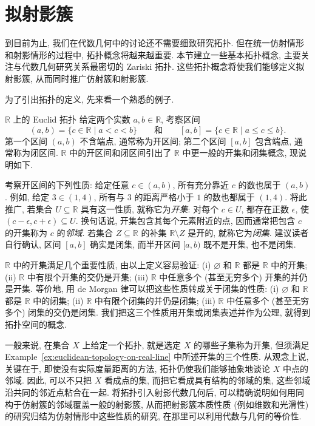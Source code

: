 \section{拟射影簇}\label{sec:quasiprojective-varieties}

到目前为止, 我们在代数几何中的讨论还不需要细致研究拓扑. 但在统一仿射情形和射影情形的过程中, 拓扑概念将越来越重要. 本节建立一些基本拓扑概念, 主要关注与代数几何研究关系最密切的 Zariski 拓扑. 这些拓扑概念将使我们能够定义拟射影簇, 从而同时推广仿射簇和射影簇.

为了引出拓扑的定义, 先来看一个熟悉的例子.

\begin{Example}{$\mathbb{R}$ 上的 Euclid 拓扑}\leavevmode\label{ex:euclidean-topology-on-real-line}
给定两个实数 $a,b\in\mathbb{R}$, 考察区间
\[
  (a,b)=\{c\in\mathbb{R}\mid a<c<b\}\qquad\text{和}\qquad
  [a,b]=\{c\in\mathbb{R}\mid a\le c\le b\}.
\]
第一个区间 $(a,b)$ 不含端点, 通常称为\textquotedbl{}开\textquotedbl{}区间; 第二个区间 $[a,b]$ 包含端点, 通常称为\textquotedbl{}闭\textquotedbl{}区间. $\mathbb{R}$ 中的开区间和闭区间引出了 $\mathbb{R}$ 中更一般的开集和闭集概念, 现说明如下.

考察开区间的下列性质: 给定任意 $c\in(a,b)$, 所有充分靠近 $c$ 的数也属于 $(a,b)$. 例如, 给定 $3\in(1,4)$, 所有与 $3$ 的距离严格小于 $1$ 的数也都属于 $(1,4)$. 将此推广, 若集合 $U\subseteq\mathbb{R}$ 具有这一性质, 就称它为\emph{开集}: 对每个 $c\in U$, 都存在正数 $\epsilon$, 使 $(c-\epsilon,c+\epsilon)\subseteq U$. 换句话说, 开集包含其每个元素\textquotedbl{}附近\textquotedbl{}的点, 因而通常把包含 $c$ 的开集称为 $c$ 的\emph{邻域}. 若集合 $Z\subseteq\mathbb{R}$ 的补集 $\mathbb{R}\setminus Z$ 是开的, 就称它为\emph{闭集}. 建议读者自行确认, 区间 $[a,b]$ 确实是闭集, 而半开区间 $[a,b)$ 既不是开集, 也不是闭集.

$\mathbb{R}$ 中的开集满足几个重要性质, 由以上定义容易验证: (i) $\varnothing$ 和 $\mathbb{R}$ 都是 $\mathbb{R}$ 中的开集; (ii) $\mathbb{R}$ 中有限个开集的交仍是开集; (iii) $\mathbb{R}$ 中任意多个 (甚至无穷多个) 开集的并仍是开集. 等价地, 用 de Morgan 律可以把这些性质转成关于闭集的性质: (i) $\varnothing$ 和 $\mathbb{R}$ 都是 $\mathbb{R}$ 中的闭集; (ii) $\mathbb{R}$ 中有限个闭集的并仍是闭集; (iii) $\mathbb{R}$ 中任意多个 (甚至无穷多个) 闭集的交仍是闭集. 我们把这三个性质用开集或闭集表述并作为公理, 就得到拓扑空间的概念.
\end{Example}

一般来说, 在集合 $X$ 上给定一个拓扑, 就是选定 $X$ 的哪些子集称为\textquotedbl{}开\textquotedbl{}集, 但须满足 Example~\ref{ex:euclidean-topology-on-real-line} 中所述开集的三个性质. 从观念上说, 关键在于, 即使没有实际度量距离的方法, 拓扑仍使我们能够抽象地谈论 $X$ 中点的\textquotedbl{}邻域\textquotedbl{}. 因此, 可以不只把 $X$ 看成点的集, 而把它看成具有结构的邻域的集, 这些邻域沿共同的邻近点粘合在一起. 将拓扑引入射影代数几何后, 可以精确说明如何用同构于仿射簇的邻域覆盖一般的射影簇, 从而把射影簇本质性质 (例如维数和光滑性) 的研究归结为仿射情形中这些性质的研究, 在那里可以利用代数与几何的等价性.

